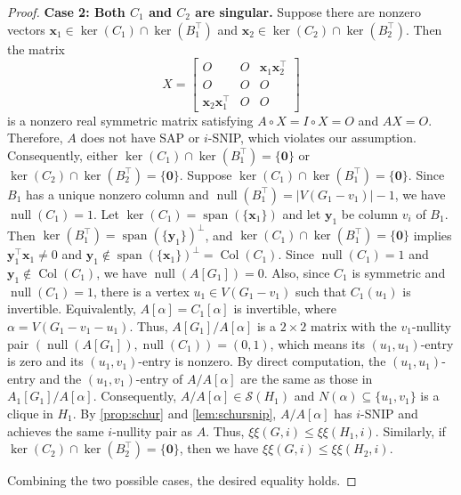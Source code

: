 \documentclass{article}
\theoremstyle{definition}
\newcommand{\trans}{^\top}
\newcommand{\bzero}{\mathbf{0}}
\newcommand{\bx}{\mathbf{x}}
\newcommand{\by}{\mathbf{y}}
\newcommand{\nul}{\operatorname{null}}
\newcommand{\Col}{\operatorname{Col}}
\newcommand{\vspan}{\operatorname{span}}
\newcommand{\mptn}{\mathcal{S}} %
\newcommand{\excise}{\xi\xi}
\begin{document}
\begin{proof}
{\bf Case 2: Both $C_1$ and $C_2$ are singular.} Suppose there are nonzero vectors $\bx_1\in\ker(C_1)\cap\ker(B_1\trans)$ and $\bx_2\in\ker(C_2)\cap\ker(B_2\trans)$.  Then the matrix 
\[
    X = 
    \begin{bmatrix}
        O & O & \bx_1\bx_2\trans \\
        O & O & O \\
        \bx_2\bx_1\trans & O & O
    \end{bmatrix}
\]
is a nonzero real symmetric matrix satisfying $A\circ X = I\circ X = O$ and $AX = O$.  Therefore, $A$ does not have SAP or $i$-SNIP, which violates our assumption.  Consequently, either $\ker(C_1)\cap\ker(B_1\trans) = \{\bzero\}$ or $\ker(C_2)\cap\ker(B_2\trans) = \{\bzero\}$.  Suppose $\ker(C_1)\cap\ker(B_1\trans) = \{\bzero\}$.  Since $B_1$ has a unique nonzero column and $\nul(B_1\trans) = |V(G_1 - v_1)| - 1$, we have $\nul(C_1) = 1$.
Let $\ker(C_1) = \vspan(\{\bx_1\})$ and let $\by_1$ be column $v_i$ of $B_1$.  Then $\ker(B_1\trans) = \vspan(\{\by_1\})^\perp$, and $\ker(C_1)\cap\ker(B_1\trans) = \{\bzero\}$ implies $\by_1\trans\bx_1 \neq 0$ and $\by_1\notin\vspan(\{\bx_1\})^\perp = \Col(C_1)$.  Since $\nul(C_1) = 1$ and $\by_1\notin\Col(C_1)$, we have $\nul(A[G_1]) = 0$.
Also, since $C_1$ is symmetric and $\nul(C_1) = 1$, there is a vertex $u_1\in V(G_1 - v_1)$ such that $C_1(u_1)$ is invertible.
Equivalently, $A[\alpha] = C_1[\alpha]$ is invertible, where $\alpha = V(G_1 - v_1 - u_1)$.  Thus, $A[G_1] / A[\alpha]$ is a $2\times 2$ matrix with the $v_1$-nullity pair $(\nul(A[G_1]), \nul(C_1)) = (0,1)$, which means its $(u_1,u_1)$-entry is zero and its $(u_1,v_1)$-entry is nonzero.
By direct computation, the $(u_1,u_1)$-entry and the $(u_1,v_1)$-entry of $A / A[\alpha]$ are the same as those in $A_1[G_1] / A[\alpha]$.  Consequently, $A/A[\alpha]\in\mptn(H_1)$ and $N(\alpha) \subseteq \{u_1,v_1\}$ is a clique in $H_1$.
By \cref{prop:schur} and \cref{lem:schursnip}, $A/A[\alpha]$ has $i$-SNIP and achieves the same $i$-nullity pair as $A$.  Thus, $\excise(G,i) \leq \excise(H_1,i)$.  Similarly, if $\ker(C_2)\cap\ker(B_2\trans) = \{\bzero\}$, then we have $\excise(G,i) \leq \excise(H_2,i)$.

Combining the two possible cases, the desired equality holds.
\end{proof}

\end{document}
